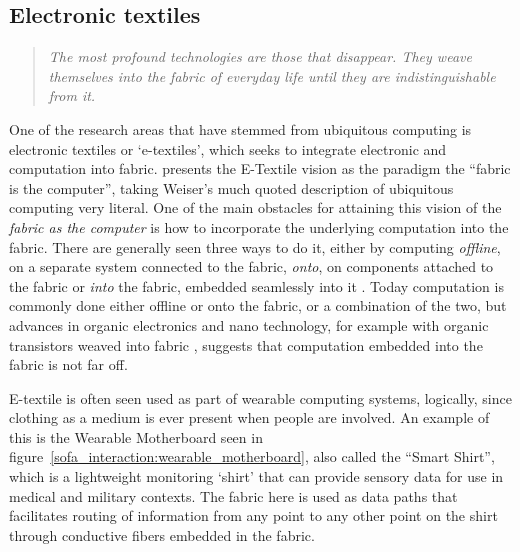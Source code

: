 \subsection{Electronic textiles}
\label{ch:textiletouch:related:etextiles}
\begin{quotation}
\emph{The most profound technologies are those that disappear. They weave themselves into the fabric of everyday life until they are indistinguishable from it. \citep{weiser1991computer}}
\end{quotation}
One of the research areas that have stemmed from ubiquitous computing is electronic textiles or `e-textiles', which seeks to integrate electronic and computation into fabric.
\citet{park2002wearable} presents the E-Textile vision as the paradigm the ``fabric is the computer'', taking Weiser's much quoted description of ubiquitous computing very literal.
One of the main obstacles for attaining this vision of the \emph{fabric as the computer} is how to incorporate the underlying computation into the fabric.
There are generally seen three ways to do it, either by computing \emph{offline}, on a separate system connected to the fabric, \emph{onto}, on components attached to the fabric or \emph{into} the fabric, embedded seamlessly into it \citep{marculescu2003}.
Today computation is commonly done either offline or onto the fabric, or a combination of the two, but advances in organic electronics and nano technology, for example with organic transistors weaved into fabric \citep{lee2005weave}, suggests that computation embedded into the fabric is not far off.

E-textile is often seen used as part of wearable computing systems, logically, since clothing as a medium is ever present when people are involved.
An example of this is the Wearable Motherboard \citep{gopalsamy1999wearable} seen in figure~\ref{sofa_interaction:wearable_motherboard}, also called the ``Smart Shirt'', which is a lightweight monitoring `shirt' that can provide sensory data for use in medical and military contexts.
The fabric here is used as data paths that facilitates routing of information from any point to any other point on the shirt through conductive fibers embedded in the fabric.

